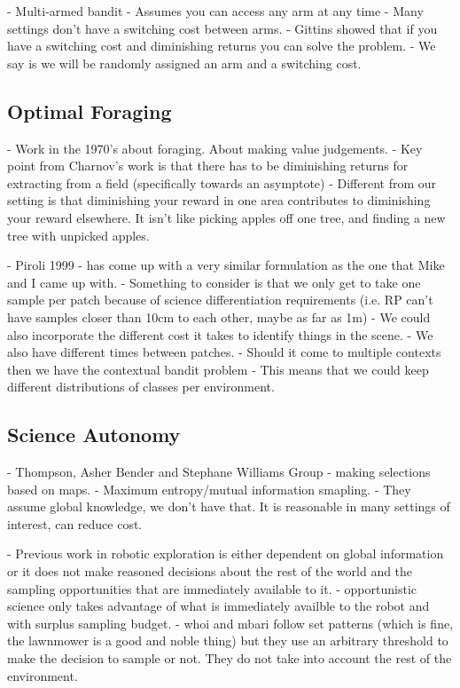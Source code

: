 		- Multi-armed bandit
			- Assumes you can access any arm at any time
			- Many settings don't have a switching cost between arms.
			- Gittins showed that if you have a switching cost and diminishing returns you can solve the problem.
			- We say is we will be randomly assigned an arm and a switching cost.

\subsection{Optimal Foraging}

	- Work in the 1970's about foraging.  About making value judgements.
		- Key point from Charnov's work is that there has to be diminishing returns
		for extracting from a field (specifically towards an asymptote)
		- Different from our setting is that diminishing your reward in one area 
		contributes to diminishing your reward elsewhere. It isn't like picking
		apples off one tree, and finding a new tree with unpicked apples.


	- Piroli 1999 - has come up with a very similar formulation as the one that 
		Mike and I came up with.
		- Something to consider is that we only get to take one sample per patch 
			because of science differentiation requirements (i.e. RP can't have 
			samples closer than 10cm to each other, maybe as far as 1m)
		- We could also incorporate the different cost it takes to identify things 
			in the scene.
		- We also have different times between patches.
		- Should it come to multiple contexts then we have the contextual bandit 
			problem
				- This means that we could keep different distributions of classes per 
					environment.


\subsection{Science Autonomy}

	- Thompson, Asher Bender and Stephane Williams Group
			- making selections based on maps.  
			- Maximum entropy/mutual information smapling.
			- They assume global knowledge, we don't have that.  It is reasonable
			in many settings of interest, can reduce cost.


	- Previous work in robotic exploration is either dependent on global information or it does not make reasoned decisions about the rest of the world and the sampling opportunities that are immediately available to it.
			- opportunistic science only takes advantage of what is immediately availble to the robot and with surplus sampling budget.
			- whoi and mbari follow set patterns (which is fine, the lawnmower is a good and noble thing) but they use an arbitrary threshold to make the decision to sample or not.  They do not take into account the rest of the environment.


